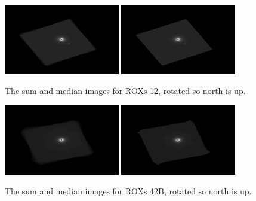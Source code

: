 \documentclass[12pt]{article}
\begin{document}
\begin{figure}[H]
\centering
\includegraphics[width=0.45\textwidth]{sum_rot_12.png}
\includegraphics[width=0.45\textwidth]{med_rot_12.png}
\vspace{-1em}
\caption{The sum and median images for ROXs 12, rotated so north is up.}
\end{figure}
\vspace{-1em}
\begin{figure}[H]
\centering
\includegraphics[width=0.45\textwidth]{sum_rot_42b.png}
\includegraphics[width=0.45\textwidth]{med_rot_42b.png}
\vspace{-1em}
\caption{The sum and median images for ROXs 42B, rotated so north is up.}
\end{figure}
\vspace{-1em}
\end{document}

